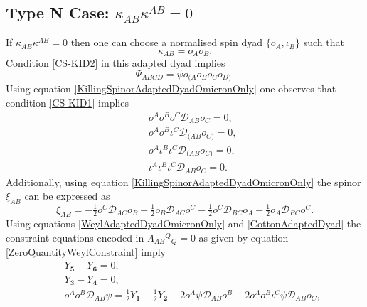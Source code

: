 \documentclass[10pt,a4paper]{article}
\theoremstyle{plain}
\begin{document}
\subsection{Type N Case: $\kappa_{AB}\kappa^{AB}= 0$}

If $\kappa_{AB}\kappa^{AB}= 0$ then one can choose a normalised spin
dyad $\{o_{A},\iota_{B}\}$ such that 
\begin{equation} \label{KillingSpinorAdaptedDyadOmicronOnly}
\kappa_{AB}= o_{A}o_{B}.
\end{equation}
Condition \eqref{CS-KID2} in this adapted dyad implies
\begin{equation}\label{WeylAdaptedDyadOmicronOnly}
\Psi_{ABCD}=\psi o_{(A}o_{B}o_{C}o_{D)}.
\end{equation}
Using equation \eqref{KillingSpinorAdaptedDyadOmicronOnly} one
observes that condition \eqref{CS-KID1} implies
\begin{subequations}
\begin{eqnarray}
&& o^{A} o^{B} o^{C} \mathcal{D}_{AB}o_{C} =
  0, \label{Eq5aSecond}\\ && o^{A} o^{B} \iota^{C}
  \mathcal{D}_{(AB}o_{C)} = 0, \label{Eq5bSecond} \\ && o^{A}
  \iota^{B} \iota^{C} \mathcal{D}_{(AB}o_{C)} = 0, \label{Eq5cSecond}
  \\ && \iota^{A} \iota^{B} \iota^{C} \mathcal{D}_{AB}o_{C} =
  0. \label{Eq5dSecond}
\end{eqnarray}
\end{subequations}
Additionally, using equation
\eqref{KillingSpinorAdaptedDyadOmicronOnly} the spinor $\xi_{AB}$ can
be expressed as
\begin{equation}\label{SpacespinorAuxiliaryVectorInDyadOmicronOnly}
\xi_{AB} = - \tfrac{1}{2} o^{C} \mathcal{D}_{AC}o_{B} - \tfrac{1}{2}
o_{B} \mathcal{D}_{AC}o^{C} - \tfrac{1}{2} o^{C} \mathcal{D}_{BC}o_{A}
- \tfrac{1}{2} o_{A} \mathcal{D}_{BC}o^{C}.
\end{equation}
Using equations \eqref{WeylAdaptedDyadOmicronOnly} and
\eqref{CottonAdaptedDyad} the constraint equations encoded in
$\Lambda_{AB}{}^{Q}{}_{Q}=0$ as given by equation 
\eqref{ZeroQuantityWeylConstraint} imply
\begin{subequations}
\begin{eqnarray}
&& Y_{\bm5}-Y_{\bm6} =0, \label{EqA4aSecond}\\
&& Y_{\bm3}-Y_{\bm4} =0, \label{EqA4bSecond}\\
&& o^{A} o^{B} \mathcal{D}_{AB}\psi = \tfrac{1}{2} Y_{\bm1} - 
 \tfrac{1}{2} Y_{\bm2} - 2 o^{A} \psi \mathcal{D}_{AB}o^{B} - 2 o^{A} o^{B} \iota^{C} 
\psi \mathcal{D}_{AB}o_{C},\label{EqA4cSecond}
\end{eqnarray}
\end{subequations}
\end{document}
